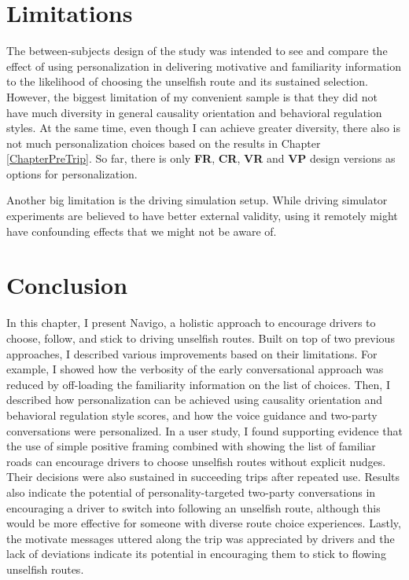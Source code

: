 \section{Limitations}
The between-subjects design of the study was intended to see and compare the effect of using personalization in delivering motivative and familiarity information to the likelihood of choosing the unselfish route and its sustained selection. However, the biggest limitation of my convenient sample is that they did not have much diversity in general causality orientation and behavioral regulation styles. At the same time, even though I can achieve greater diversity, there also is not much personalization choices based on the results in Chapter \ref{ChapterPreTrip}. So far, there is only \textbf{FR}, \textbf{CR}, \textbf{VR} and \textbf{VP} design versions as options for personalization. 

Another big limitation is the driving simulation setup. While driving simulator experiments are believed to have better external validity\cite{fayyaz2020choices}, using it remotely might have confounding effects that we might not be aware of. 

\section{Conclusion}
In this chapter, I present Navigo, a holistic approach to encourage drivers to choose, follow, and stick to driving unselfish routes. Built on top of two previous approaches, I described various improvements based on their limitations. For example, I showed how the verbosity of the early conversational approach was reduced by off-loading the familiarity information on the list of choices. Then, I described how personalization can be achieved using causality orientation and behavioral regulation style scores, and how the voice guidance and two-party conversations were personalized. In a user study, I found supporting evidence that the use of simple positive framing combined with showing the list of familiar roads can encourage drivers to choose unselfish routes without explicit nudges. Their decisions were also sustained in succeeding trips after repeated use. Results also indicate the potential of personality-targeted two-party conversations in encouraging a driver to switch into following an unselfish route, although this would be more effective for someone with diverse route choice experiences. Lastly, the motivate messages uttered along the trip was appreciated by drivers and the lack of deviations indicate its potential in encouraging them to stick to flowing unselfish routes.
